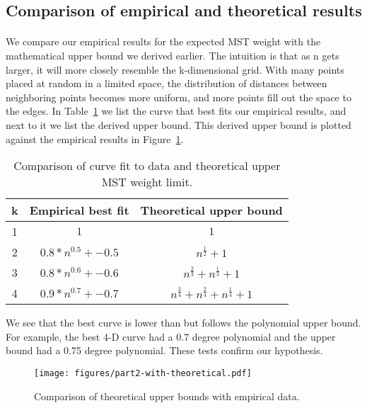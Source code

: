 
\subsection{Comparison of empirical and theoretical results}
\label{sec:part2:compare}
\paragraph{}
We compare our empirical results for the expected MST weight with the
mathematical upper bound we derived earlier. The intuition is that as n
gets larger, it will more closely resemble the k-dimensional grid. With
many points placed at random in a limited space, the distribution of
distances between neighboring points becomes more uniform, and more points
fill out the space to the edges. In Table~\ref{table:part2-comparison} we
list the curve that best fits our empirical results, and next to it we
list the derived upper bound.  This derived upper bound is plotted against the
empirical results in Figure~\ref{fig:part2-with-theoretical}.

\begin{table}
\begin{tabular}{|c|c|c|}
\hline
k&Empirical best fit&Theoretical upper bound\\
\hline
1&$1$&$1$\\
2&$0.8*n^{0.5} + -0.5$&$n^{\frac{1}{2}} + 1$\\
3&$0.8*n^{0.6} + -0.6$&$n^{\frac{2}{3}} + n^{\frac{1}{3}} + 1$\\
4&$0.9*n^{0.7} + -0.7$&$n^{\frac{3}{4}} + n^{\frac{2}{4}} + n^{\frac{1}{4}} + 1$\\
\hline
\end{tabular}
\caption{Comparison of curve fit to data and theoretical upper MST weight
  limit.}
\label{table:part2-comparison}
\end{table}

We see that the best curve is lower than but follows the polynomial upper
bound. For example, the best 4-D curve had a 0.7 degree polynomial and the
upper bound had a 0.75 degree polynomial. These tests confirm our
hypothesis.

\begin{figure}[htb!]
\centering
\texttt{[image: figures/part2-with-theoretical.pdf]}
\caption{Comparison of theoretical upper bounds with empirical data.}
\label{fig:part2-with-theoretical}
\end{figure}
